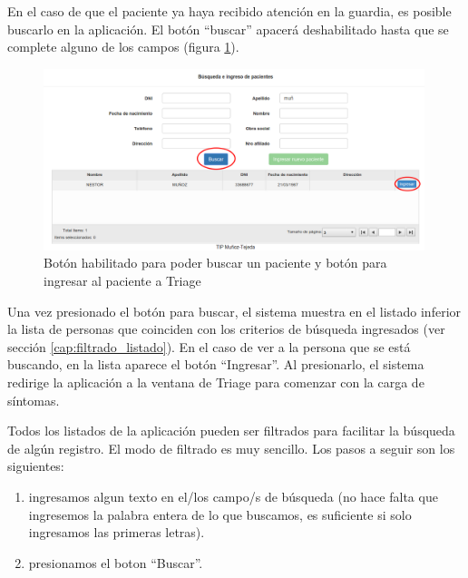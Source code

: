 En el caso de que el paciente ya haya recibido atención en la guardia, es posible buscarlo en la aplicación. El botón ``buscar'' apacerá deshabilitado hasta que se complete alguno de los campos (figura \ref{fig:inicio_busqueda}).
\begin{figure}
\centerline{\includegraphics[width=0.99\textwidth]{inicio_busqueda.png}}
\caption{Botón habilitado para poder buscar un paciente y botón para ingresar al paciente a Triage} \label{fig:inicio_busqueda}
\end{figure}
Una vez presionado el botón para buscar, el sistema muestra en el listado inferior la lista de personas que coinciden con los criterios de búsqueda ingresados (ver sección \ref{cap:filtrado_listado}). En el caso de ver a la persona que se está buscando, en la lista aparece el botón ``Ingresar''. Al presionarlo, el sistema redirige la aplicación a la ventana de Triage para comenzar con la carga de síntomas.

\label{cap:filtrado_listado}
Todos los listados de la aplicación pueden ser filtrados para facilitar la búsqueda de algún registro. El modo de filtrado es muy sencillo. Los pasos a seguir son los siguientes:
\begin{enumerate}
\item ingresamos algun texto en el/los campo/s de búsqueda (no hace falta que ingresemos la palabra entera de lo que buscamos, es suficiente si solo ingresamos las primeras letras).
\item presionamos el boton ``Buscar''.
\end{enumerate}

